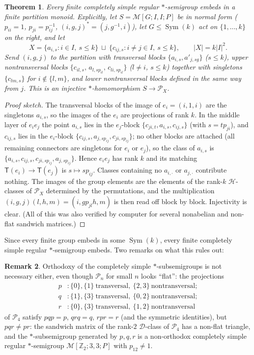 \documentclass[11pt]{amsart}
\newtheorem{theorem}{Theorem}[section]
\theoremstyle{definition}
\newtheorem{remark}[theorem]{Remark}
\newcommand{\D}{\mathcal{D}}
\newcommand{\Hh}{\mathcal{H}}
\renewcommand{\P}{\mathcal{P}}
\newcommand{\T}{\mathsf{T}}
\newcommand{\Sym}{\operatorname{Sym}}
\newcommand{\Z}{\mathbb{Z}}
\begin{document}
\begin{theorem}\label{thm:cs}
Every finite completely simple regular $*$-semigroup embeds in a finite partition monoid. Explicitly, let $S=\mathcal M[G;I,I;P]$ be in normal form ($p_{ii}=1$, $p_{ji}=p_{ij}^{-1}$, $(i,g,j)^*=(j,g^{-1},i)$), let $G\le\Sym(k)$ act on $\{1,\dots,k\}$ on the right, and let
\[
X=\{a_{i,s}: i\in I,\ s\le k\}\ \sqcup\ \{c_{ij,s}: i\ne j\in I,\ s\le k\},\qquad |X|=k|I|^2 .
\]
Send $(i,g,j)$ to the partition with transversal blocks $\{a_{i,s},a'_{j,sg}\}$ ($s\le k$), upper nontransversal blocks $\{c_{il,s},\,a_{l,sp_{il}},\,c_{li,sp_{il}}\}$ ($l\ne i$, $s\le k$) together with singletons $\{c_{lm,s}\}$ for $i\notin\{l,m\}$, and lower nontransversal blocks defined in the same way from $j$. This is an injective $*$-homomorphism $S\to\P_X$.
\end{theorem}

\begin{proof}[Proof sketch]
The transversal blocks of the image of $e_i=(i,1,i)$ are the singletons $a_{i,s}$, so the images of the $e_i$ are projections of rank $k$. In the middle layer of $e_ie_j$ the point $a_{i,s}$ lies in the $e_j$-block $\{c_{ji,t},a_{i,s},c_{ij,s}\}$ (with $s=tp_{ji}$), and $c_{ij,s}$ lies in the $e_i$-block $\{c_{ij,s},a_{j,sp_{ij}},c_{ji,sp_{ij}}\}$; no other blocks are attached (all remaining connectors are singletons for $e_i$ or $e_j$), so the class of $a_{i,s}$ is $\{a_{i,s},c_{ij,s},c_{ji,sp_{ij}},a_{j,sp_{ij}}\}$. Hence $e_ie_j$ has rank $k$ and its matching $\T(e_i)\to\T(e_j)$ is $s\mapsto sp_{ij}$. Classes containing no $a_{i,\cdot}$ or $a_{j,\cdot}$ contribute nothing. The images of the group elements are the elements of the rank-$k$ $\Hh$-classes of $\P_X$ determined by the permutations, and the multiplication $(i,g,j)(l,h,m)=(i,gp_{jl}h,m)$ is then read off block by block. Injectivity is clear. (All of this was also verified by computer for several nonabelian and non-flat sandwich matrices.)
\end{proof}

Since every finite group embeds in some $\Sym(k)$, every finite completely simple regular $*$-semigroup embeds. Two remarks on what this rules out:

\begin{remark}\label{rem:orthodox}
Orthodoxy of the completely simple $*$-subsemigroups is not necessary either, even though $\P_n$ for small $n$ looks ``flat'': the projections
\begin{align*}
p&: \{0\},\{1\}\ \text{transversal},\ \{2,3\}\ \text{nontransversal};\\
q&: \{1\},\{3\}\ \text{transversal},\ \{0,2\}\ \text{nontransversal};\\
r&: \{0\},\{3\}\ \text{transversal},\ \{1,2\}\ \text{nontransversal}
\end{align*}
of $\P_4$ satisfy $pqp=p$, $qrq=q$, $rpr=r$ (and the symmetric identities), but $pqr\ne pr$: the sandwich matrix of the rank-$2$ $\D$-class of $\P_4$ has a non-flat triangle, and the $*$-subsemigroup generated by $p,q,r$ is a non-orthodox completely simple regular $*$-semigroup $\mathcal M[\Z_2;3,3;P]$ with $p_{12}\ne1$.
\end{remark}
\end{document}
